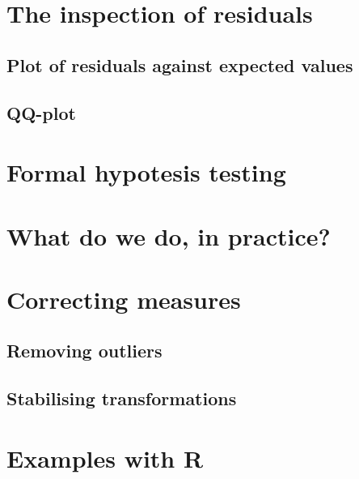 \documentclass[a4paper,12pt,oneside]{book}
\begin{document}
\hypertarget{the-inspection-of-residuals}{%
\section{The inspection of residuals}\label{the-inspection-of-residuals}}

\hypertarget{plot-of-residuals-against-expected-values}{%
\subsection{Plot of residuals against expected values}\label{plot-of-residuals-against-expected-values}}

\hypertarget{qq-plot}{%
\subsection{QQ-plot}\label{qq-plot}}

\hypertarget{formal-hypotesis-testing}{%
\section{Formal hypotesis testing}\label{formal-hypotesis-testing}}

\hypertarget{what-do-we-do-in-practice}{%
\section{What do we do, in practice?}\label{what-do-we-do-in-practice}}

\hypertarget{correcting-measures}{%
\section{Correcting measures}\label{correcting-measures}}

\hypertarget{removing-outliers}{%
\subsection{Removing outliers}\label{removing-outliers}}

\hypertarget{stabilising-transformations}{%
\subsection{Stabilising transformations}\label{stabilising-transformations}}

\hypertarget{examples-with-r}{%
\section{Examples with R}\label{examples-with-r}}
\end{document}
